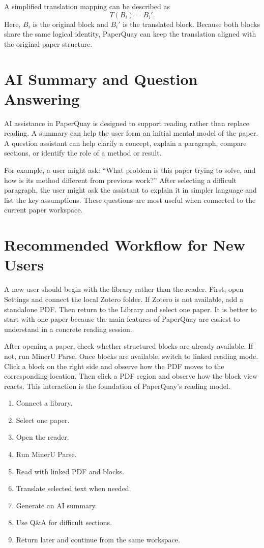 ﻿\documentclass[11pt,a4paper]{article}
\begin{document}
A simplified translation mapping can be described as
\begin{equation}
T(B_i) = B_i'.
\end{equation}
Here, $B_i$ is the original block and $B_i'$ is the translated block. Because both blocks share the same logical identity, PaperQuay can keep the translation aligned with the original paper structure.

\section{AI Summary and Question Answering}

AI assistance in PaperQuay is designed to support reading rather than replace reading. A summary can help the user form an initial mental model of the paper. A question assistant can help clarify a concept, explain a paragraph, compare sections, or identify the role of a method or result.

For example, a user might ask: ``What problem is this paper trying to solve, and how is its method different from previous work?'' After selecting a difficult paragraph, the user might ask the assistant to explain it in simpler language and list the key assumptions. These questions are most useful when connected to the current paper workspace.

\section{Recommended Workflow for New Users}

A new user should begin with the library rather than the reader. First, open Settings and connect the local Zotero folder. If Zotero is not available, add a standalone PDF. Then return to the Library and select one paper. It is better to start with one paper because the main features of PaperQuay are easiest to understand in a concrete reading session.

After opening a paper, check whether structured blocks are already available. If not, run MinerU Parse. Once blocks are available, switch to linked reading mode. Click a block on the right side and observe how the PDF moves to the corresponding location. Then click a PDF region and observe how the block view reacts. This interaction is the foundation of PaperQuay's reading model.

\begin{enumerate}[leftmargin=2em]
  \item Connect a library.
  \item Select one paper.
  \item Open the reader.
  \item Run MinerU Parse.
  \item Read with linked PDF and blocks.
  \item Translate selected text when needed.
  \item Generate an AI summary.
  \item Use Q\&A for difficult sections.
  \item Return later and continue from the same workspace.
\end{enumerate}
\end{document}
